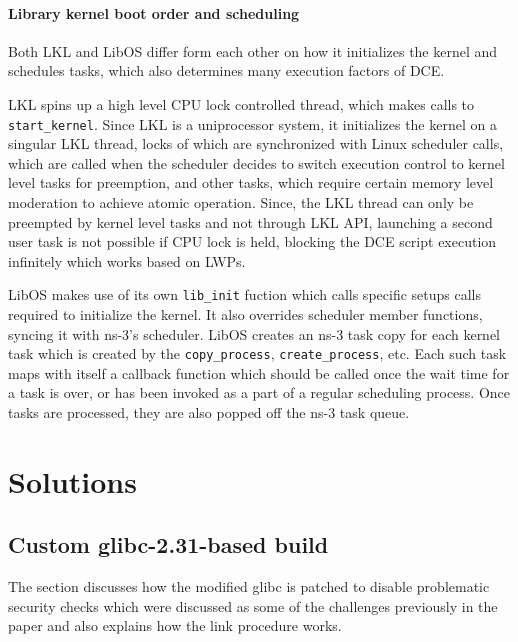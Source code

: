 \documentclass{sig-alternate}
\begin{document}
\paragraph{Library kernel boot order and scheduling}
Both LKL and LibOS differ form each other on how it initializes the kernel and schedules tasks, which also determines many execution factors of DCE. 

LKL spins up a high level CPU lock controlled thread, which makes calls to \texttt{start\_kernel}. Since LKL is a uniprocessor system, it initializes 
the kernel on a singular LKL thread, 
locks of which are synchronized with Linux scheduler calls, which are called when the scheduler decides to switch execution control 
to kernel level tasks for preemption, and other tasks, which require certain memory level moderation to achieve
atomic operation. Since, the LKL thread can only be preempted by kernel level tasks and not through LKL API, launching a second user task is not possible if 
CPU lock is held, blocking the DCE script execution infinitely which works based on LWPs.

LibOS makes 
use of its own \texttt{lib\_init} fuction which calls specific setups calls required to initialize the kernel.
It also overrides scheduler member functions, syncing it with ns-3's 
scheduler. LibOS creates an ns-3 task copy for each kernel task which is created by the \texttt{copy\_process}, \texttt{create\_process},
etc. Each such task maps with itself a callback function which should be called once the wait time
for a task is over, or has been invoked as a part of a regular scheduling process. Once tasks are processed, they are 
also popped off the ns-3 task queue.

\section{Solutions}
\label{section:design}

\subsection{Custom glibc-2.31-based build}
The section discusses how the modified glibc is patched to disable problematic security checks which were discussed as some of the challenges previously
in the paper and also explains how the link procedure works.
\end{document}
